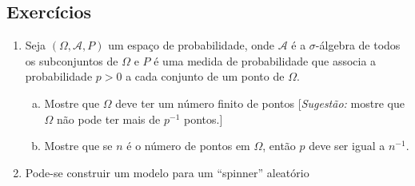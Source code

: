 \documentclass[../Notas.tex]{subfiles}
\begin{document}
\subsection{Exercícios}
\begin{enumerate}
    \item Seja $(\Omega, \mathcal{A}, P)$ um espaço de probabilidade, onde $\mathcal{A}$ é a $\sigma$-álgebra de todos os subconjuntos de $\Omega$ e $P$ é uma medida de probabilidade que associa a probabilidade $p>0$ a cada conjunto de um ponto de $\Omega$.
    \begin{enumerate}[a)]
        \item Mostre que $\Omega$ deve ter um número finito de pontos [\textit{Sugestão:} mostre que $\Omega$ não pode ter mais de $p^{-1}$ pontos.]
        \item Mostre que se $n$ é o número de pontos em $\Omega$, então $p$ deve ser igual a $n^{-1}$.
    \end{enumerate}
    \item Pode-se construir um modelo para um ``spinner'' aleatório
\end{enumerate}
\end{document}

